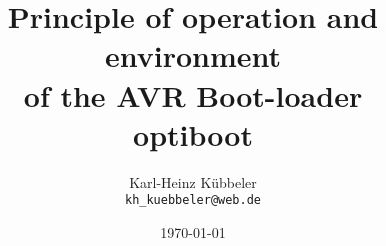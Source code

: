 \documentclass[pdftex,12pt,a4paper,oneside,english]{report}
\begin{document}
\title{Principle of operation and environment\\
of the AVR Boot-loader \\
 optiboot\\
}
\author{Karl-Heinz Kübbeler\\
\texttt{kh\_kuebbeler@web.de}}
\date{\today}

\maketitle
\tableofcontents












\end{document}
